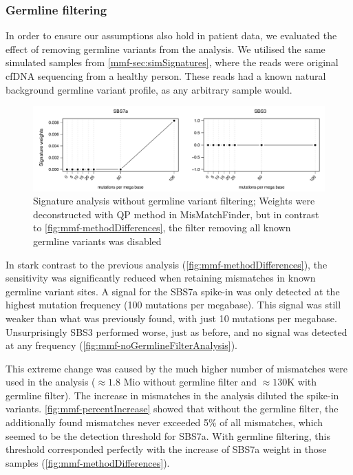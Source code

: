 \subsubsection{Germline filtering}
\label{mmf-sec:germlinefiltering}
In order to ensure our assumptions also hold in  patient data, we evaluated the effect of removing germline variants from the analysis. We utilised the same simulated samples from \autoref{mmf-sec:simSignatures}, where the reads were original cfDNA sequencing from a healthy person. These reads had a known natural background germline variant profile, as any arbitrary sample would.

\begin{figure}[ht]
\centering
\includegraphics[width=.99\linewidth]{Figures/MisMatchFinder/noGermlineFilterAnalysis.pdf}
\caption[Signature analysis without germline variant filtering]{Signature analysis without germline variant filtering; Weights were deconstructed with QP method in MisMatchFinder, but in contrast to \protect\autoref{fig:mmf-methodDifferences}, the filter removing all known germline variants was disabled}\label{fig:mmf-noGermlineFilterAnalysis}
\end{figure}

In stark contrast to the previous analysis (\autoref{fig:mmf-methodDifferences}), the sensitivity was significantly reduced when retaining mismatches in known germline variant sites. A signal for  the SBS7a spike-in was only detected at the highest mutation frequency (100 mutations per megabase). This signal was still weaker than what was previously found, with just 10 mutations per megabase. Unsurprisingly SBS3 performed worse, just as before, and no signal was detected at any frequency (\autoref{fig:mmf-noGermlineFilterAnalysis}).

This extreme change was caused by the much higher number of mismatches  were used in the analysis ($\approx 1.8$ Mio without germline filter and $\approx 130$K with germline filter).
The increase in mismatches in the analysis diluted the spike-in variants. \autoref{fig:mmf-percentIncrease} showed that without the germline filter, the additionally found mismatches never exceeded 5\% of all mismatches, which seemed to be the detection threshold for SBS7a. With germline filtering, this threshold corresponded perfectly with the increase of SBS7a weight in those samples (\autoref{fig:mmf-methodDifferences}).

